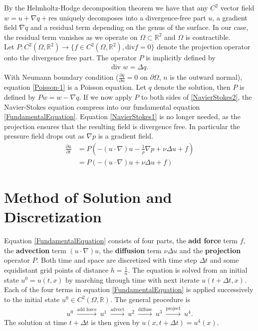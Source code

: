 \documentclass[a4paper,10pt,oneside,final,german,openbib,pdftex,titlepage]{scrbook}
\begin{document}
By the Helmholtz-Hodge decomposition theorem we have that any $C^2$ vector field $w = u + \nabla q + \text{res}$ uniquely decomposes into a divergence-free part $u$, a gradient field $\nabla q$ and a residual term depending on the genus of the surface. In our case, the residual term vanishes as we operate on $\Omega \subset \mathbb{R}^2$ and $\Omega$ is contractible.\\

Let $P : C^2(\Omega,\mathbb{R}^2) \rightarrow \{f\in C^2(\Omega, \mathbb{R}^2), \text{div} f = 0\}$ denote the projection operator onto the divergence free part. The operator $P$ is implicitly defined by 
\begin{align}
	\text{div } w = \Delta q. \label{Poisson-1}
\end{align}
With Neumann boundary condition ($\frac{\partial q}{\partial n} = 0$ on $\partial \Omega$, $n$ is the outward normal), equation \ref{Poisson-1} is a Poisson equation. Let $q$ denote the solution, then $P$ is defined by $Pw = w - \nabla q$. 
If we now apply $P$ to both sides of \ref{NavierStokes2}, the Navier-Stokes equation compress into our fundamental equation \ref{FundamentalEquation}. Equation \ref{NavierStokes1} is no longer needed, as the projection ensures that the resulting field is divergence free. In particular the pressure field drops out as $\nabla p$ is a gradient field.
\begin{align}
	\frac{\partial u}{\partial t} &= P \left(- (u \cdot \nabla)u - \frac{1}{\rho}\nabla p + \nu \Delta u + f \right) \nonumber
	\\
	&= P\left( -(u \cdot \nabla)u + \nu \Delta u + f\right)\label{FundamentalEquation}
\end{align}
\section{Method of Solution and Discretization}
Equation \ref{FundamentalEquation} consists of four parts, the \textbf{add force} term $f$, the \textbf{advection} term $(u\cdot \nabla )u$, the \textbf{diffusion} term $\nu \Delta u$ and the \textbf{projection} operator $P$. Both time and space are discretized with time step $\Delta t$ and some equidistant grid points of distance $h= \frac{1}{n}$. The equation is solved from an initial state $u^0 = u(t,x)$ by marching through time with next iterate $u(t+\Delta t,x)$. 
Each of the four terms in equation \ref{FundamentalEquation} is applied successively to the initial state $u^0 \in C^2(\Omega,\mathbb{R})$. The general procedure is
\begin{align*}
	u^0 ~\overset{\text{add force}}{\longrightarrow}~ u^1 ~ \overset{\text{advect}}{\longrightarrow}~ u^2 ~\overset{\text{diffuse}}{\longrightarrow} ~u^3~ \overset{\text{project}}{\longrightarrow} ~u^4.
\end{align*}
The solution at time $t+\Delta t$ is then given by $u(x,t+\Delta t) = u^4(x)$.
\end{document}
